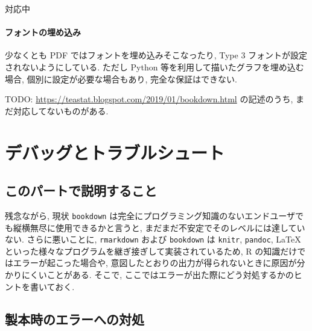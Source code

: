 \documentclass[
  xelatex,ja=standard,jafont=noto]{bxjsbook}
\theoremstyle{definition}
\theoremstyle{definition}
\theoremstyle{definition}
\theoremstyle{definition}
\theoremstyle{remark}
\begin{document}
対応中

\hypertarget{ux30d5ux30a9ux30f3ux30c8ux306eux57cbux3081ux8fbcux307f}{%
\subsection{フォントの埋め込み}\label{ux30d5ux30a9ux30f3ux30c8ux306eux57cbux3081ux8fbcux307f}}

少なくとも PDF ではフォントを埋め込みそこなったり, Type 3
フォントが設定されないようにしている. ただし Python
等を利用して描いたグラフを埋め込む場合, 個別に設定が必要な場合もあり,
完全な保証はできない.

TODO: \url{https://teastat.blogspot.com/2019/01/bookdown.html}
の記述のうち, まだ対応してないものがある.

\hypertarget{part-ux30c7ux30d0ux30c3ux30b0ux3068ux30c8ux30e9ux30d6ux30ebux30b7ux30e5ux30fcux30c8}{%
\part{
デバッグとトラブルシュート}\label{part-ux30c7ux30d0ux30c3ux30b0ux3068ux30c8ux30e9ux30d6ux30ebux30b7ux30e5ux30fcux30c8}}

\hypertarget{ux3053ux306eux30d1ux30fcux30c8ux3067ux8aacux660eux3059ux308bux3053ux3068}{%
\chapter*{このパートで説明すること}\label{ux3053ux306eux30d1ux30fcux30c8ux3067ux8aacux660eux3059ux308bux3053ux3068}}

残念ながら, 現状 \texttt{bookdown}
は完全にプログラミング知識のないエンドユーザでも縦横無尽に使用できるかと言うと,
まだまだ不安定でそのレベルには達していない. さらに悪いことに,
\texttt{rmarkdown} および \texttt{bookdown} は \texttt{knitr},
\texttt{pandoc}, LaTeX
といった様々なプログラムを継ぎ接ぎして実装されているため, R
の知識だけではエラーが起こった場合や,
意図したとおりの出力が得られないときに原因が分かりにくいことがある.
そこで, ここではエラーが出た際にどう対処するかのヒントを書いておく.

\hypertarget{ux88fdux672cux6642ux306eux30a8ux30e9ux30fcux3078ux306eux5bfeux51e6}{%
\chapter{製本時のエラーへの対処}\label{ux88fdux672cux6642ux306eux30a8ux30e9ux30fcux3078ux306eux5bfeux51e6}}
\end{document}
